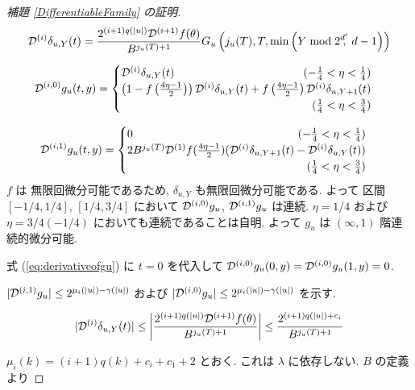 \begin{proof}[\rm 補題 \ref{DifferentiableFamily} の証明]
  \begin{equation}
   \mathcal D^{(i)}\delta_{u,Y}(t) 
    = \frac{2^{(i+1)q(|u|)} \mathcal D^{(i+1)}f(\theta)}{B^{j_u(T)+1}}
    G_u\left( j_u(T), T, \min \left(Y \bmod 2^{d'}\!\!\!,\ d-1 \right) \right)
  \end{equation}

  \begin{equation}
   \label{eq:derivativeofgu}
    \D{i,0} g_u(t, y)
     = \begin{cases}
	\D{i} \delta_{u, Y}(t) 
	\hfill (- \frac 1 4 < \eta < \frac 1 4) \\
	\left( 1-f \left(\frac{4\eta-1}{2}\right)\right) 
	\D{i} \delta_{u, Y}(t) 
	+ f \left(\frac{4\eta-1}{2}\right) \D{i} \delta_{u,Y+1}(t) \\
	\hfill (\frac 1 4 < \eta < \frac 3 4)
       \end{cases}
  \end{equation}   

  \begin{equation}
    \D{i,1} g_u(t, y)
     = \begin{cases}
	0 \hfill (- \frac 1 4 < \eta < \frac 1 4) \\
	2B^{j_u(T)}\D{1}f(\frac{4\eta - 1}2)
	(\D{i}\delta_{u,Y+1}(t)-\D{i}\delta_{u, Y}(t)) \\
	\hfill (\frac 1 4 < \eta < \frac 3 4)
       \end{cases}
  \end{equation}
  $f$ は 無限回微分可能であるため, $\delta_{u,Y}$ も無限回微分可能である.
  よって 区間 $[-1/4, 1/4]$, $[1/4, 3/4]$ において
  $\mathcal D^{(i,0)} g_u$, $\mathcal D^{(i,1)} g_u$ は連続. 
  $\eta = 1/4$ および  $\eta = 3/4(-1/4)$ においても連続であることは自明.
  よって $g_u$ は $(\infty, 1)$ 階連続的微分可能.

  式 (\ref{eq:derivativeofgu}) に $t = 0$ を代入して
  $\mathcal D^{(i, 0)} g_u(0,y) = \mathcal D^{(i, 0)} g_u(1,y) = 0$.

  $|\mathcal D^{(i,1)} g_u| \leq 2^{\mu_i (|u|) - \gamma(|u|)}$ および
  $|\mathcal D^{(i,0)} g_u| \leq 2^{\mu_i (|u|) - \gamma(|u|)}$ を示す.

  \begin{equation}
   |\mathcal D^{(i)}\delta_{u, Y}(t)| 
    \le \left|\frac{2^{(i+1)q(|u|)}\mathcal D^{(i+1)}f(\theta)}{B^{j_u(T)+1}} \right|
    \le \frac{2^{(i+1)q(|u|) + c_i}}{B^{j_u(T)+1}}\\
  \end{equation}

  $\mu_i(k) = (i+1)q(k) + c_i + c_1 + 2$ とおく.
  これは $\lambda$ に依存しない.
  $B$ の定義より


\end{proof}
